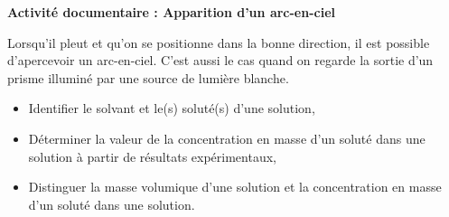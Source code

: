 \modeCorrection

\renewcommand{\thesubsection}{\textcolor{red}{\Roman{section}.\arabic{subsection}}}
\renewcommand{\thesubsubsection}{\textcolor{red}{\Roman{section}.\arabic{subsection}.\alph{subsubsection}}}

\setcounter{section}{0}
\setcounter{document}{0}
\sndEnTeteActDeux

\begin{center}
\begin{mdframed}[style=titr, leftmargin=60pt, rightmargin=60pt, innertopmargin=7pt, innerbottommargin=7pt, innerrightmargin=8pt, innerleftmargin=8pt]

\begin{center}
\large{\textbf{Activité documentaire : Apparition d'un arc-en-ciel}}
\end{center}

\end{mdframed}
\end{center}

\begin{tcolorbox}[colback=orange!5!white,colframe=orange!75!black,title= Contexte de l'activité]
Lorsqu'il pleut et qu'on se positionne dans la bonne direction, il est possible d'apercevoir un arc-en-ciel. C'est aussi le cas quand on regarde la sortie d'un prisme illuminé par une source de lumière blanche.
\end{tcolorbox}
\begin{tcolorbox}[colback=blue!5!white,colframe=blue!75!black,title=Objectifs :]
\begin{itemize}
    \item Identifier le solvant et le(s) soluté(s) d’une solution,
    \item Déterminer la valeur de la concentration en masse d’un soluté dans une solution à partir de résultats expérimentaux,
    \item Distinguer la masse volumique d’une solution et la concentration en masse d’un soluté dans une solution.
\end{itemize}
\end{tcolorbox}

   
